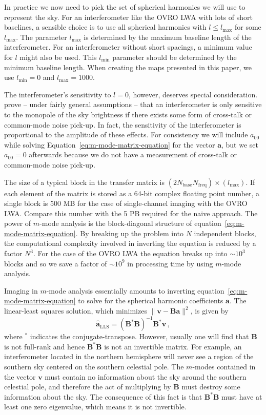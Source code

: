 \documentclass[twocolumn]{aastex6}
\renewcommand{\b}{\pmb}
\begin{document}
In practice we now need to pick the set of spherical harmonics we will use to represent the sky. For
an interferometer like the OVRO LWA with lots of short baselines, a sensible choice is to use all
spherical harmonics with $l\le l_\text{max}$ for some $l_\text{max}$. The parameter $l_\text{max}$
is determined by the maximum baseline length of the interferometer.  For an interferometer without
short spacings, a minimum value for $l$ might also be used. This $l_\text{min}$ parameter should be
determined by the minimum baseline length.  When creating the maps presented in this paper, we use
$l_\text{min} = 0$ and $l_\text{max} = 1000$.

The interferometer's sensitivity to $l=0$, however, deserves special consideration.
\citet{2016ApJ...826..116V} prove -- under fairly general assumptions -- that an interferometer is
only sensitive to the monopole of the sky brightness if there exists some form of cross-talk or
common-mode noise pick-up. In fact, the sensitivity of the interferometer is proportional to the
amplitude of these effects. For consistency we will include $a_{00}$ while solving
Equation~\ref{eq:m-mode-matrix-equation} for the vector $\b a$, but we set $a_{00} = 0$ afterwards
because we do not have a measurement of cross-talk or common-mode noise pick-up.

The size of a typical block in the transfer matrix is
$(2N_\text{base}N_\text{freq})\times(l_\text{max})$. If each element of the matrix is stored as a
64-bit complex floating point number, a single block is 500 MB for the case of single-channel
imaging with the OVRO LWA. Compare this number with the 5 PB required for the naive approach.  The
power of $m$-mode analysis is the block-diagonal structure of
equation~\ref{eq:m-mode-matrix-equation}.  By breaking up the problem into $N$ independent blocks,
the computational complexity involved in inverting the equation is reduced by a factor $N^3$. For
the case of the OVRO LWA the equation breaks up into $\sim10^3$ blocks and so we save a factor of
$\sim10^9$ in processing time by using $m$-mode analysis.

Imaging in $m$-mode analysis essentially amounts to inverting
equation~\ref{eq:m-mode-matrix-equation} to solve for the spherical harmonic coefficients $\b a$.
The linear-least squares solution, which minimizes $\|\b v - \b B\b a\|^2$, is given by
\begin{equation}
    \b{\hat a}_\text{LLS} = (\b B^*\b B)^{-1}\b B^*\b v\,,
\end{equation}
where $^*$ indicates the conjugate-transpose. However, usually one will find that $\b B$ is not
full-rank and hence $\b B^*\b B$ is not an invertible matrix. For example, an interferometer located
in the northern hemisphere will never see a region of the southern sky centered on the southern
celestial pole. The $m$-modes contained in the vector $\b v$ must contain no information
about the sky around the southern celestial pole, and therefore the act of multiplying by $\b B$
must destroy some information about the sky. The consequence of this fact is that $\b B^*\b B$ must
have at least one zero eigenvalue, which means it is not invertible.
\end{document}
